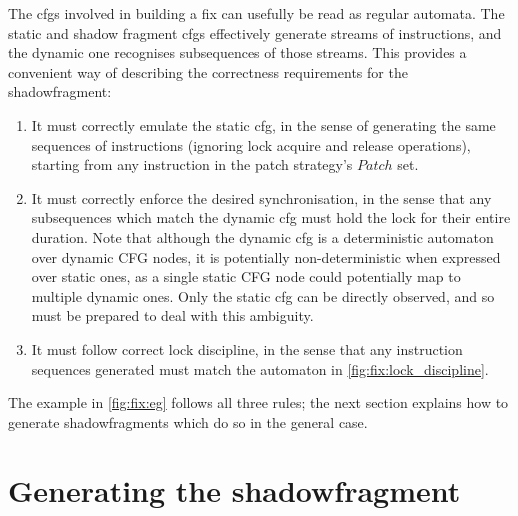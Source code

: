 The \glspl{cfg} involved in building a fix can usefully be read as
regular automata.  The static and shadow fragment \glspl{cfg}
effectively generate streams of instructions, and the dynamic one
recognises subsequences of those streams.  This provides a convenient
way of describing the correctness requirements for the
\gls{shadowfragment}:
\begin{enumerate}
\item It must correctly emulate the \gls{static cfg}, in the sense of
  generating the same sequences of instructions (ignoring lock acquire
  and release operations), starting from any instruction in the patch
  strategy's $\mathit{Patch}$ set.
\item It must correctly enforce the desired synchronisation, in the
  sense that any subsequences which match the \gls{dynamic cfg} must
  hold the lock for their entire duration.  Note that although the
  \gls{dynamic cfg} is a deterministic automaton over dynamic CFG
  nodes, it is potentially non-deterministic when expressed over
  static ones, as a single static CFG node could potentially map to
  multiple dynamic ones.  Only the \gls{static cfg} can be directly
  observed, and so {\technique} must be prepared to deal with this
  ambiguity.
\item It must follow correct lock discipline, in the sense that any
  instruction sequences generated must match the automaton in
  \autoref{fig:fix:lock_discipline}.
\end{enumerate}
The example in \autoref{fig:fix:eg} follows all three rules; the next
section explains how to generate \glspl{shadowfragment} which do so in
the general case.

\section[Generating the \glsentrytext{shadowfragment}]{Generating the \gls{shadowfragment}}
\label{sect:fixing:shadowfrag}

